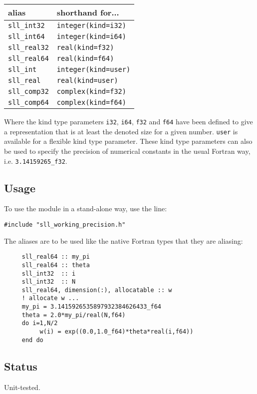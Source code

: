 \documentclass[]{report}   %
\begin{document}
\vspace{+0.5cm}
\begin{tabular}{l l}
alias & shorthand for... \\
\hline
\verb+sll_int32+ & \verb+integer(kind=i32)+ \\
\verb+sll_int64+ & \verb+integer(kind=i64)+ \\
\verb+sll_real32+ & \verb+real(kind=f32)+ \\
\verb+sll_real64+ & \verb+real(kind=f64)+ \\
\verb+sll_int+  & \verb+integer(kind=user)+ \\
\verb+sll_real+ & \verb+real(kind=user)+ \\
\verb+sll_comp32+ & \verb+complex(kind=f32)+\\
\verb+sll_comp64+ & \verb+complex(kind=f64)+\\
\hline
\end{tabular}
\vspace{+0.5cm}


Where the kind type parameters \verb+i32+, \verb+i64+, \verb+f32+ and \verb+f64+ have been defined to give a representation that is at least the denoted size for a given number. \verb+user+ is available for a flexible kind type parameter. These kind type parameters can also be used to specify the precision of numerical constants in the usual Fortran way, i.e. \verb+3.14159265_f32+.

\subsection{Usage}
To use the module in a stand-alone way, use the line:
\begin{verbatim}
#include "sll_working_precision.h"
\end{verbatim}

The aliases are to be used like the native Fortran types that they are aliasing:

\begin{verbatim}
     sll_real64 :: my_pi
     sll_real64 :: theta
     sll_int32  :: i
     sll_int32  :: N
     sll_real64, dimension(:), allocatable :: w
     ! allocate w ...
     my_pi = 3.1415926535897932384626433_f64
     theta = 2.0*my_pi/real(N,f64)
     do i=1,N/2
          w(i) = exp((0.0,1.0_f64)*theta*real(i,f64))
     end do
\end{verbatim}

\subsection{Status}
Unit-tested.
\end{document}
